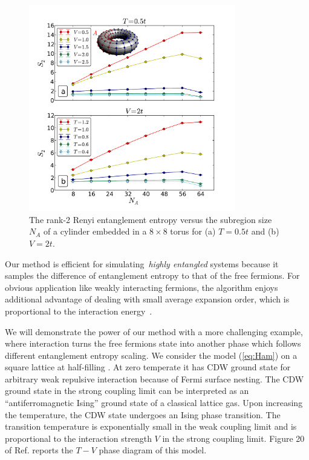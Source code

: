\documentclass[12pt,onecolumn,english,prl,showpacs,nofootinbib]{revtex4-1}
\begin{document}
\begin{figure}[t]
\centering
\includegraphics[width=9cm]{scanNA.pdf}
\caption{The rank-2 Renyi entanglement entropy versus the subregion size $N_{A}$ of a cylinder embedded in a $8\times8$ torus for (a) $T=0.5t$ and (b) $V=2t$.}
\label{fig:scanNA}
\end{figure}

Our method is efficient for simulating~\emph{highly entangled} systems because it samples the difference of entanglement entropy to that of the free fermions. For obvious application like weakly interacting fermions, the algorithm enjoys additional advantage of dealing with small average expansion order, which is proportional to the interaction energy~\cite{Rubtsov:2005iw, Gull:2011jd}. 

We will demonstrate the power of our method with a more challenging example, where interaction turns the free fermions state into another phase which follows different entanglement entropy scaling. We consider the model (\ref{eq:Ham}) on a square lattice at half-filling \cite{PhysRevB.29.5253, Gubernatis:1985wo}. At zero temperate it has CDW ground state for arbitrary weak repulsive interaction because of Fermi surface nesting. The CDW ground state in the strong coupling limit can be interpreted as an  ``antiferromagnetic Ising'' ground state of a classical lattice gas. Upon increasing the temperature, the CDW state undergoes an Ising phase transition. The transition temperature is exponentially small in the weak coupling limit and is proportional to the interaction strength $V$ in the strong coupling limit.  Figure 20 of Ref. \cite{Gubernatis:1985wo} reports the $T-V$ phase diagram of this model. 
\end{document}
